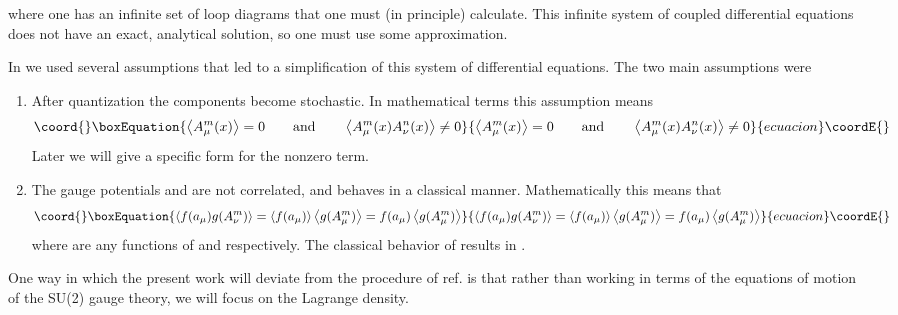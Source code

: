 \documentclass[a4paper,aps,showpacs]{revtex4}
\begin{document}
where one has an infinite set of loop diagrams that one must (in
principle) calculate. This infinite system of coupled differential equations
does not have an exact, analytical solution, so one must use some
approximation.
\par
In \cite{dzhsin02a} we used several assumptions that led to a simplification
of this system of differential equations. The two main assumptions were 
\begin{enumerate}
  \item
  After quantization the components \coordHE{}
  become stochastic. In mathematical terms this assumption means
\begin{equation}\coord{}\boxEquation{
  \left\langle A^m_\mu (x) \right\rangle = 0
  \qquad \text{and} \qquad
  \left\langle
  A^m_\mu (x) A^n_\nu (x) \right\rangle \neq 0 
  \label{sec2-60}
}{
  \left\langle A^m_\mu (x) \right\rangle = 0
  \qquad \text{and} \qquad
  \left\langle
  A^m_\mu (x) A^n_\nu (x) \right\rangle \neq 0 
  }{ecuacion}\coordE{}\end{equation}
Later we will give a specific form for the nonzero term. 
   \item
  The gauge potentials \coordHE{} and \coordHE{} are not correlated, and
  \coordHE{} behaves in a classical manner.
  Mathematically this means that
\begin{equation}\coord{}\boxEquation{
  \left\langle f(a_\mu) g(A^m_\nu) \right\rangle =
  \left\langle f(a_\mu) \right\rangle
  \left\langle g(A^m_\mu) \right\rangle =
  f(a_\mu)  \left\langle g(A^m_\mu) \right\rangle 
\label{sec2-80}
}{
  \left\langle f(a_\mu) g(A^m_\nu) \right\rangle =
  \left\langle f(a_\mu) \right\rangle
  \left\langle g(A^m_\mu) \right\rangle =
  f(a_\mu)  \left\langle g(A^m_\mu) \right\rangle 
}{ecuacion}\coordE{}\end{equation}
  where \coordHE{} are any functions of \coordHE{} and \coordHE{} respectively.
  The classical behavior of \coordHE{}  results in \coordHE{}. 
\end{enumerate}
One way in which the present work will deviate from the procedure of ref. \cite{dzhsin02a} is
that rather than working in terms of the equations of motion of the SU(2) gauge theory, we
will focus on the Lagrange density.
\end{document}
